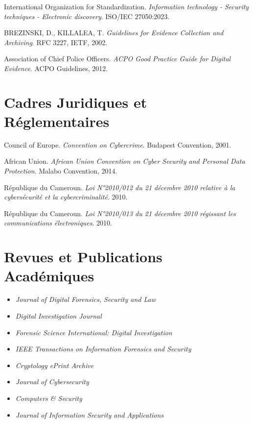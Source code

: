 \documentclass[11pt,a4paper,oneside]{book}
\begin{document}
\begin{thebibliography}{99}
        International Organization for Standardization.
        \emph{Information technology - Security techniques - Electronic discovery}.
        ISO/IEC 27050:2023.

        BREZINSKI, D., KILLALEA, T.
        \emph{Guidelines for Evidence Collection and Archiving}.
        RFC 3227, IETF, 2002.

        Association of Chief Police Officers.
        \emph{ACPO Good Practice Guide for Digital Evidence}.
        ACPO Guidelines, 2012.


      \section*{Cadres Juridiques et Réglementaires}


        Council of Europe.
        \emph{Convention on Cybercrime}.
        Budapest Convention, 2001.

        African Union.
        \emph{African Union Convention on Cyber Security and Personal Data Protection}.
        Malabo Convention, 2014.

        République du Cameroun.
        \emph{Loi N°2010/012 du 21 décembre 2010 relative à la cybersécurité et la cybercriminalité}.
        2010.

        République du Cameroun.
        \emph{Loi N°2010/013 du 21 décembre 2010 régissant les communications électroniques}.
        2010.


      \section*{Revues et Publications Académiques}

      \begin{itemize}
        \item \emph{Journal of Digital Forensics, Security and Law}
        \item \emph{Digital Investigation Journal}
        \item \emph{Forensic Science International: Digital Investigation}
        \item \emph{IEEE Transactions on Information Forensics and Security}
        \item \emph{Cryptology ePrint Archive}
        \item \emph{Journal of Cybersecurity}
        \item \emph{Computers \& Security}
        \item \emph{Journal of Information Security and Applications}
      \end{itemize}


\end{thebibliography}
\end{document}
